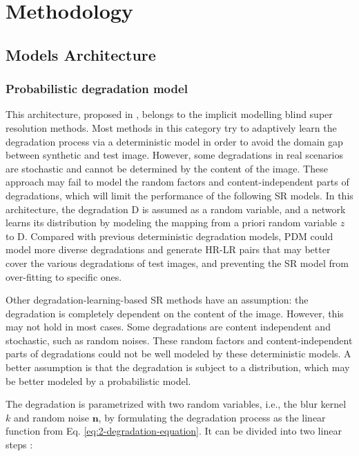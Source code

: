 \section{Methodology} \label{sec:methodology}


\subsection{Models Architecture}

\subsubsection{Probabilistic degradation model}

    This architecture, proposed in \cite{luo2022learning}, belongs to the implicit modelling blind super resolution methods. 
    Most methods in this category try to adaptively learn the degradation process via a deterministic model in order to avoid the domain gap between synthetic and test image.
    However, some degradations in real scenarios are stochastic and cannot be determined by the content of the image.
    These approach may fail to model the random factors and content-independent parts of degradations, which will limit the performance of the following SR models.
    In this architecture, the degradation D is assumed as a random variable, and a network learns its distribution by modeling the mapping from a priori random variable $z$ to D.
    Compared with previous deterministic degradation models, PDM could model more diverse degradations and generate HR-LR pairs that may better cover the various degradations of test images, and preventing the SR model from over-fitting to specific ones.

    Other degradation-learning-based SR methods have an assumption: the degradation is completely dependent on the content of the image.
    However, this may not hold in most cases.
    Some degradations are content independent and stochastic, such as random noises. 
    These random factors and content-independent parts of degradations could not be well modeled by these deterministic models. 
    A better assumption is that the degradation is subject to a distribution, which may be better modeled by a probabilistic model.
    
    The degradation is parametrized with two random variables, i.e., the blur kernel $k$ and random noise $\mathbf{n}$, by formulating the degradation process as the linear function from Eq. \ref{eq:2-degradation-equation}.
    It can be divided into two linear steps \cite{zhu2020unpaired}: 

